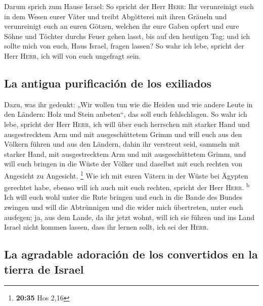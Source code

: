  Darum sprich zum Hause Israel: So spricht der Herr
\textsc{Herr}: Ihr verunreinigt euch in dem Wesen eurer Väter und treibt
Abgötterei mit ihren Gräueln  und verunreinigt euch an
euren Götzen, welchen ihr eure Gaben opfert und eure Söhne und Töchter
durchs Feuer gehen lasst, bis auf den heutigen Tag; und ich sollte mich
von euch, Haus Israel, fragen lassen? So wahr ich lebe, spricht der Herr
\textsc{Herr}, ich will von euch ungefragt sein.

\hypertarget{la-antigua-purificaciuxf3n-de-los-exiliados}{%
\subsection{La antigua purificación de los
exiliados}\label{la-antigua-purificaciuxf3n-de-los-exiliados}}

 Dazu, was ihr gedenkt: „Wir wollen tun wie die Heiden
und wie andere Leute in den Ländern: Holz und Stein anbeten``, das soll
euch fehlschlagen.  So wahr ich lebe, spricht der Herr
\textsc{Herr}, ich will über euch herrschen mit starker Hand und
ausgestrecktem Arm und mit ausgeschüttetem Grimm  und
will euch aus den Völkern führen und aus den Ländern, dahin ihr
verstreut seid, sammeln mit starker Hand, mit ausgestrecktem Arm und mit
ausgeschüttetem Grimm,  und will euch bringen in die
Wüste der Völker und daselbst mit euch rechten von Angesicht zu
Angesicht. \footnote{\textbf{20:35} Hos 2,16}  Wie ich
mit euren Vätern in der Wüste bei Ägypten gerechtet habe, ebenso will
ich auch mit euch rechten, spricht der Herr \textsc{Herr}.
\textsuperscript{b}  Ich will euch wohl unter die Rute
bringen und euch in die Bande des Bundes zwingen  und
will die Abtrünnigen und die wider mich übertreten, unter euch ausfegen;
ja, aus dem Lande, da ihr jetzt wohnt, will ich sie führen und ins Land
Israel nicht kommen lassen, dass ihr lernen sollt, ich sei der
\textsc{Herr}.

\hypertarget{la-agradable-adoraciuxf3n-de-los-convertidos-en-la-tierra-de-israel}{%
\subsection{La agradable adoración de los convertidos en la tierra de
Israel}\label{la-agradable-adoraciuxf3n-de-los-convertidos-en-la-tierra-de-israel}}

